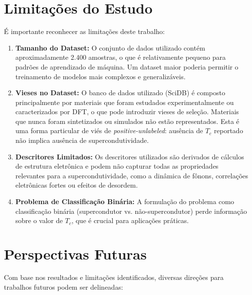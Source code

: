 \documentclass[12pt, a4paper, oneside]{report}
\begin{document}
\section{Limitações do Estudo}
\label{sec:limitacoes}

É importante reconhecer as limitações deste trabalho:

\begin{enumerate}
    \item \textbf{Tamanho do Dataset:} O conjunto de dados utilizado contém aproximadamente 2.400 amostras, o que é relativamente pequeno para padrões de aprendizado de máquina. Um dataset maior poderia permitir o treinamento de modelos mais complexos e generalizáveis.
    \item \textbf{Vieses no Dataset:} O banco de dados utilizado (SciDB) é composto principalmente por materiais que foram estudados experimentalmente ou caracterizados por DFT, o que pode introduzir vieses de seleção. Materiais que nunca foram sintetizados ou simulados não estão representados. Esta é uma forma particular de viés de \textit{positive-unlabeled}: ausência de $T_c$ reportado não implica ausência de supercondutividade.
    \item \textbf{Descritores Limitados:} Os descritores utilizados são derivados de cálculos de estrutura eletrônica e podem não capturar todas as propriedades relevantes para a supercondutividade, como a dinâmica de fônons, correlações eletrônicas fortes ou efeitos de desordem.
    \item \textbf{Problema de Classificação Binária:} A formulação do problema como classificação binária (supercondutor vs. não-supercondutor) perde informação sobre o valor de $T_c$, que é crucial para aplicações práticas.
\end{enumerate}

\section{Perspectivas Futuras}

Com base nos resultados e limitações identificados, diversas direções para trabalhos futuros podem ser delineadas:
\end{document}
